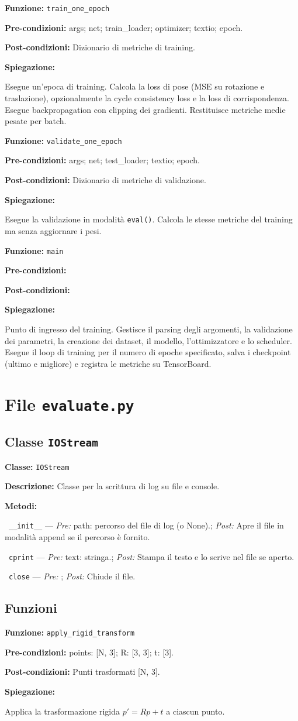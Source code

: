 \documentclass[11pt,a4paper]{article}
\newenvironment{functionspec}[3]{%
    \par\medskip\noindent
    \textbf{Funzione:} \texttt{#1}\par
    \textbf{Pre-condizioni:} #2\par
    \textbf{Post-condizioni:} #3\par
    \textbf{Spiegazione:}\par\noindent\ignorespaces
}{%
    \par\medskip
}
\newenvironment{classspec}[2]{%
    \par\medskip\noindent
    \textbf{Classe:} \texttt{#1}\par
    \textbf{Descrizione:} #2\par
    \textbf{Metodi:}\par
    \begingroup
    \setlength{\parindent}{0pt}%
    \setlength{\parskip}{2pt}%
}{%
    \endgroup
    \par\medskip
}
\newcommand{\method}[3]{%
    \noindent\hspace*{1.2em}\textbullet~\texttt{#1} --- \textit{Pre:} #2; \textit{Post:} #3\par
}
\begin{document}
\begin{functionspec}{train\_one\_epoch}{args; net; train\_loader; optimizer; textio; epoch.}{Dizionario di metriche di training.}
Esegue un'epoca di training. Calcola la loss di pose (MSE su rotazione e traslazione), opzionalmente la cycle consistency loss e la loss di corrispondenza. Esegue backpropagation con clipping dei gradienti. Restituisce metriche medie pesate per batch.
\end{functionspec}

\begin{functionspec}{validate\_one\_epoch}{args; net; test\_loader; textio; epoch.}{Dizionario di metriche di validazione.}
Esegue la validazione in modalità \texttt{eval()}. Calcola le stesse metriche del training ma senza aggiornare i pesi.
\end{functionspec}

\begin{functionspec}{main}{}{}
Punto di ingresso del training. Gestisce il parsing degli argomenti, la validazione dei parametri, la creazione dei dataset, il modello, l'ottimizzatore e lo scheduler. Esegue il loop di training per il numero di epoche specificato, salva i checkpoint (ultimo e migliore) e registra le metriche su TensorBoard.
\end{functionspec}

\section{File \texttt{evaluate.py}}

\subsection{Classe \texttt{IOStream}}

\begin{classspec}{IOStream}{Classe per la scrittura di log su file e console.}
\method{\_\_init\_\_}{path: percorso del file di log (o None).}{Apre il file in modalità append se il percorso è fornito.}
\method{cprint}{text: stringa.}{Stampa il testo e lo scrive nel file se aperto.}
\method{close}{}{Chiude il file.}
\end{classspec}

\subsection{Funzioni}

\begin{functionspec}{apply\_rigid\_transform}{points: [N, 3]; R: [3, 3]; t: [3].}{Punti trasformati [N, 3].}
Applica la trasformazione rigida \(p' = R p + t\) a ciascun punto.
\end{functionspec}
\end{document}
